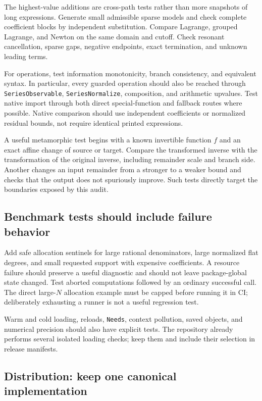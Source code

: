 The highest-value additions are cross-path tests rather than more snapshots of long expressions. Generate small admissible sparse models and check complete coefficient blocks by independent substitution. Compare Lagrange, grouped Lagrange, and Newton on the same domain and cutoff. Check resonant cancellation, sparse gaps, negative endpoints, exact termination, and unknown leading terms.

For operations, test information monotonicity, branch consistency, and equivalent syntax. In particular, every guarded operation should also be reached through \texttt{SeriesObservable}, \texttt{SeriesNormalize}, composition, and arithmetic upvalues. Test native import through both direct special-function and fallback routes where possible. Native comparison should use independent coefficients or normalized residual bounds, not require identical printed expressions.

A useful metamorphic test begins with a known invertible function $f$ and an exact affine change of source or target. Compare the transformed inverse with the transformation of the original inverse, including remainder scale and branch side. Another changes an input remainder from a stronger to a weaker bound and checks that the output does not spuriously improve. Such tests directly target the boundaries exposed by this audit.

\subsection{Benchmark tests should include failure behavior}

Add safe allocation sentinels for large rational denominators, large normalized flat degrees, and small requested support with expensive coefficients. A resource failure should preserve a useful diagnostic and should not leave package-global state changed. Test aborted computations followed by an ordinary successful call. The direct large-$N$ allocation example must be capped before running it in CI; deliberately exhausting a runner is not a useful regression test.

Warm and cold loading, reloads, \texttt{Needs}, context pollution, saved objects, and numerical precision should also have explicit tests. The repository already performs several isolated loading checks; keep them and include their selection in release manifests.\cite{development,validation}

\subsection{Distribution: keep one canonical implementation}


